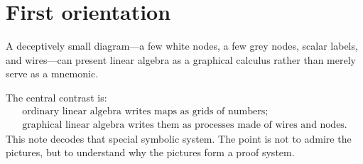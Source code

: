 
\newcommand{\wireone}{%
\begin{tikzpicture}[baseline=-0.55ex,scale=0.5]
  \draw (0,0) -- (0,1.4);
\end{tikzpicture}%
}
\newcommand{\copygen}{%
\begin{tikzpicture}[baseline=-0.55ex,scale=0.5]
  \draw (0,0) -- (0,0.55);
  \draw (0,0.55) -- (-0.45,1.25);
  \draw (0,0.55) -- (0.45,1.25);
  \draw[fill=white] (0,0.55) circle (0.13);
\end{tikzpicture}%
}
\newcommand{\discardgen}{%
\begin{tikzpicture}[baseline=-0.55ex,scale=0.5]
  \draw (0,0) -- (0,0.95);
  \draw[fill=white] (0,1.05) circle (0.15);
\end{tikzpicture}%
}
\newcommand{\addgen}{%
\begin{tikzpicture}[baseline=-0.55ex,scale=0.5]
  \draw (-0.45,0) -- (0,0.65);
  \draw (0.45,0) -- (0,0.65);
  \draw (0,0.65) -- (0,1.35);
  \draw[fill=gray!45] (0,0.65) circle (0.14);
\end{tikzpicture}%
}
\newcommand{\zerogen}{%
\begin{tikzpicture}[baseline=-0.55ex,scale=0.5]
  \draw (0,0.35) -- (0,1.25);
  \draw[fill=gray!45] (0,0.3) circle (0.15);
\end{tikzpicture}%
}
\newcommand{\scalargen}[1]{%
\begin{tikzpicture}[baseline=-0.55ex,scale=0.5]
  \draw (0,0) -- (0,0.45);
  \node[draw,minimum width=0.45cm,minimum height=0.33cm,inner sep=0pt,fill=white] at (0,0.72) {\scriptsize #1};
  \draw (0,0.9) -- (0,1.35);
\end{tikzpicture}%
}

\section{First orientation}

A deceptively small diagram---a few white nodes, a few grey nodes, scalar labels, and wires---can present linear algebra as a graphical calculus rather than merely serve as a mnemonic.

The central contrast is:
\[
\begin{array}{c}
  \text{ordinary linear algebra writes maps as grids of numbers;}\\
  \text{graphical linear algebra writes them as processes made of wires and nodes.}
\end{array}
\]
This note decodes that special symbolic system.  The point is not to admire the pictures, but to understand why the pictures form a proof system.


